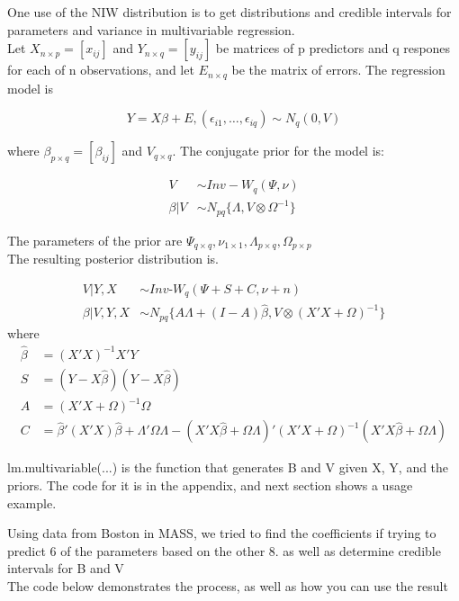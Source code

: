 \documentclass[english]{report}
\begin{document}

One use of the NIW distribution is to get distributions and credible intervals for parameters and variance in multivariable regression.\\

Let $X_{n\times p} = [x_{ij}]$ and $Y_{n\times q} = [y_{ij}]$ be matrices of p predictors and q respones for each of n observations, and let $E_{n\times q}$ be the matrix of errors. The regression model is

\[Y = X\beta + E, (\epsilon_{i1},\hdots,\epsilon_{i q})\sim N_q(0,V)\]

where $\beta_{p\times q} = [\beta_{ij}] $ and $V_{q\times q}$. The conjugate prior for the model is:

\begin{align*}
	V &\sim  Inv-W_q(\Psi,\nu)\\
	\beta|V &\sim N_{pq}\{\Lambda, V  \otimes \Omega^{-1}\}
\end{align*}

The parameters of the prior are $\Psi_{q\times q}, \nu_{1\times 1}, \Lambda_{p\times q}, \Omega_{p\times p}$\\

The resulting posterior distribution is.


\begin{align*}
	V|Y,X &\sim  Inv\text{-}W_q(\Psi+S+C,\nu+n)\\
	\beta|V,Y,X &\sim N_{pq}\{A\Lambda + (I-A)\hat{\beta}, V  \otimes (X'X +\Omega)^{-1}\}
\end{align*}
where 
\begin{align*}
\hat{\beta} &= (X'X)^{-1}X'Y\\
S &= (Y-X\hat{\beta})(Y-X\hat{\beta})\\ 
A &= (X'X + \Omega)^{-1}\Omega\\
C &= \hat{\beta}'(X'X)\hat{\beta} + \Lambda'\Omega\Lambda - (X'X\hat{\beta} + \Omega\Lambda)'(X'X+\Omega)^{-1}(X'X\hat{\beta} + \Omega\Lambda)
\end{align*}


lm.multivariable(...) is the function that generates B and V given X, Y, and the priors. The code for it is in the appendix, and next section shows a usage example.



Using data from Boston in MASS, we tried to find the coefficients if trying to predict 6 of the parameters based on the other 8. as well as determine credible intervals for B and V\\
The code below demonstrates the process, as well as how you can use the result
\end{document}
